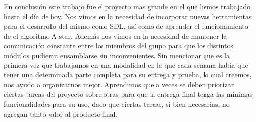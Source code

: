 En conclusión este trabajo fue el proyecto mas grande en el que hemos trabajado
hasta el día de hoy. Nos vimos en la necesidad de incorporar nuevas herramientas
para el desarrollo del mismo como SDL, así como de aprender el funcionamiento de
el algoritmo A-star. Además nos vimos en la necesidad de mantener la
comunicación constante entre los miembros del grupo para que los distintos
módulos pudieran ensamblarse sin inconvenientes. Sin mencionar que es la primera
vez que trabajamos en una modalidad en la que cada semana había que tener una
determinada parte completa para su entrega y prueba, lo cual creemos, nos ayudo a
organizarnos mejor. Aprendimos que a veces se deben priorizar ciertas tareas del
proyecto sobre otras para que la entrega final tenga las mínimas funcionalidades
para su uso, dado que ciertas tareas, si bien necesarias, no agregan tanto valor al
producto final.